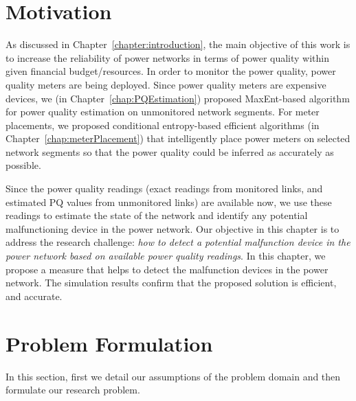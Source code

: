 \newcommand{\defeq}{\buildrel {\text{ def }}\over =}
\newcommand{\leftrightarrowtriangleqrel}{\mathrel{\overset\triangleq\leftrightarrow}}

\label{chap:predictionModel}
\section{Motivation}
As discussed in Chapter~\ref{chapter:introduction}, the main objective of this work is to increase the reliability of power networks in terms of power quality within given financial budget/resources. In order to monitor the power quality, power quality meters are being deployed. Since power quality meters are expensive devices, we (in Chapter~\ref{chap:PQEstimation}) proposed MaxEnt-based algorithm for power quality estimation on unmonitored network segments. For meter placements, we proposed conditional entropy-based efficient algorithms (in Chapter~\ref{chap:meterPlacement}) that intelligently place power meters on selected network segments so that the power quality could be inferred as accurately as possible.

Since the power quality readings (exact readings from monitored links, and estimated PQ values from unmonitored links) are available now, we use these readings to estimate the state of the network and identify any potential malfunctioning device in the power network. Our objective in this chapter is to address the research challenge: \textit{how to detect a potential malfunction device in the power network based on available power quality readings}. In this chapter, we propose a measure that helps to detect the malfunction devices in the power network. The simulation results confirm that the proposed solution is efficient, and accurate.

\section{Problem Formulation}
In this section, first we detail our assumptions of the problem domain and then formulate our research problem.

